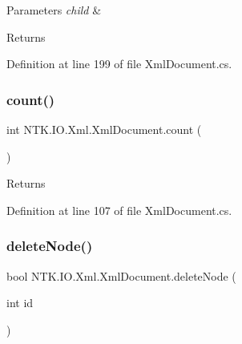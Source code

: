 \begin{DoxyParams}{Parameters}
{\em child} & \\
\hline
\end{DoxyParams}
\begin{DoxyReturn}{Returns}

\end{DoxyReturn}


Definition at line 199 of file Xml\+Document.\+cs.

\mbox{\label{class_n_t_k_1_1_i_o_1_1_xml_1_1_xml_document_a81b13574f06640144f5b40f9020d8050}} 
\subsubsection{\texorpdfstring{count()}{count()}}
{\footnotesize\ttfamily int N\+T\+K.\+I\+O.\+Xml.\+Xml\+Document.\+count (\begin{DoxyParamCaption}{ }\end{DoxyParamCaption})}





\begin{DoxyReturn}{Returns}

\end{DoxyReturn}


Definition at line 107 of file Xml\+Document.\+cs.

\mbox{\label{class_n_t_k_1_1_i_o_1_1_xml_1_1_xml_document_a43911ac872f0c78ecd3833005a447f0e}} 
\subsubsection{\texorpdfstring{deleteNode()}{deleteNode()}\hspace{0.1cm}{\footnotesize\ttfamily [1/2]}}
{\footnotesize\ttfamily bool N\+T\+K.\+I\+O.\+Xml.\+Xml\+Document.\+delete\+Node (\begin{DoxyParamCaption}\item[{int}]{id }\end{DoxyParamCaption})}






